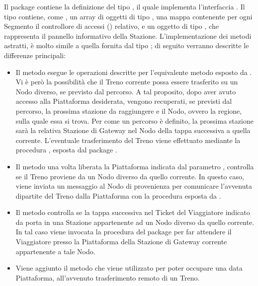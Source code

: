 	Il package  contiene la definizione del tipo  , il quale implementa l'interfaccia . Il tipo  contiene, come , un array di oggetti di tipo , una mappa  contenente per ogni Segmento il controllore di accessi () relativo, e un oggetto di tipo , che rappresenta il pannello informativo della Stazione.
	L'implementazione dei metodi astratti, è molto simile a quella fornita dal tipo ; di seguito verranno descritte le differenze principali:
	\begin{itemize}
		
		\item Il metodo  esegue le operazioni descritte per l'equivalente metodo esposto da . Vi è però la possibilità che il Treno corrente possa essere trasferito su un Nodo diverso, se previsto dal percorso. A tal proposito, dopo aver avuto accesso alla Piattaforma desiderata, vengono recuperati, se previsti dal percorso, la prossima stazione da raggiungere e il Nodo, ovvero la regione, sulla quale essa si trova. Per come un percorso è definito, la prossima stazione sarà la relativa Stazione di Gateway nel Nodo della tappa successiva a quella corrente. L'eventuale trasferimento del Treno viene effettuato mediante la procedura , esposta dal package .
		
		\item Il metodo  una volta liberata la Piattaforma indicata dal parametro , controlla se il Treno proviene da un Nodo diverso da quello corrente. In questo caso, viene inviata un messaggio al Nodo di provenienza per comunicare l'avvenuta dipartite del Treno dalla Piattaforma con la procedura  esposta da .
		
		\item Il metodo  controlla se la tappa successiva nel Ticket del Viaggiatore indicato da  porta in una Stazione appartenente ad un Nodo diverso da quello corrente. In tal caso viene invocata la procedura  del package  per far attendere il Viaggiatore presso la Piattaforma della Stazione di Gateway corrente appartenente a tale Nodo.
		
		\item Viene aggiunto il metodo  che viene utilizzato per poter occupare una data Piattaforma, all'avvenuto trasferimento remoto di un Treno.  
		
	\end{itemize}
